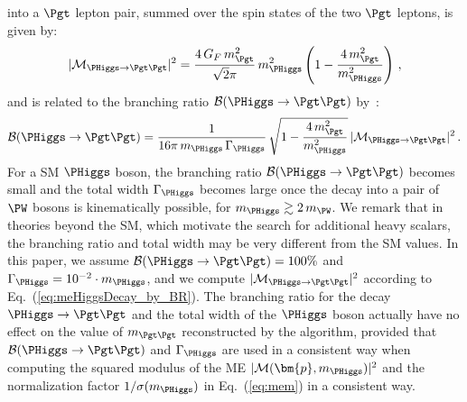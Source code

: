 into a $\Pgt$ lepton pair, summed over the spin states of the two $\Pgt$ leptons, is given by:
\begin{equation}
\vert \mathcal{M}_{\PHiggs \to \Pgt\Pgt} \vert^{2} = 
 \frac{4 \, G_{F} \, m_{\Pgt}^{2}}{\sqrt{2}\pi} \, m_{\PHiggs}^{2} \left( 1 - \frac{4 \, m_{\Pgt}^{2}}{m_{\PHiggs}^{2}} \right) \, ,
\label{eq:meHiggsDecay}
\end{equation}
and is related to the branching ratio $\mathcal{B}(\PHiggs \to \Pgt\Pgt)$
by~\cite{me_HtoTauTau}:
\begin{equation}
\mathcal{B}(\PHiggs \to \Pgt\Pgt) 
 = \frac{1}{16\pi \, m_{\PHiggs} \, \Gamma_{\PHiggs}} \, \sqrt{1 - \frac{4 \, m_{\Pgt}^{2}}{m_{\PHiggs}^{2}}} \, \vert \mathcal{M}_{\PHiggs \to \Pgt\Pgt} \vert^{2} \, .
\label{eq:meHiggsDecay_by_BR}
\end{equation}
For a SM $\PHiggs$ boson,
the branching ratio $\mathcal{B}(\PHiggs \to \Pgt\Pgt)$ becomes small and the total width $\Gamma_{\PHiggs}$ becomes large
once the decay into a pair of $\PW$ bosons is kinematically possible,
\ie for $m_{\PHiggs} \gtrsim 2 \, m_{\PW}$.
We remark that in theories beyond the SM, which motivate the search
for additional heavy scalars,
the branching ratio and total width may be very different from the SM
values.
In this paper, we assume $\mathcal{B}(\PHiggs \to \Pgt\Pgt) = 100\%$
and $\Gamma_{\PHiggs} = 10^{-2} \cdot m_{\PHiggs}$, 
and we compute $\vert \mathcal{M}_{\PHiggs \to \Pgt\Pgt} \vert^{2}$ according to Eq.~(\ref{eq:meHiggsDecay_by_BR}).
The branching ratio for the decay $\PHiggs \to \Pgt\Pgt$ and the total width of the $\PHiggs$ boson
actually have no effect on the value of $m_{\Pgt\Pgt}$ reconstructed by the algorithm, 
provided that $\mathcal{B}(\PHiggs \to \Pgt\Pgt)$ and $\Gamma_{\PHiggs}$ are used in
a consistent way when computing the squared modulus of the ME $\vert \mathcal{M}(\bm{p},m_{\PHiggs}) \vert^{2}$ and
the normalization factor $1/\sigma(m_{\PHiggs})$ in Eq.~(\ref{eq:mem}) in a
consistent way.

